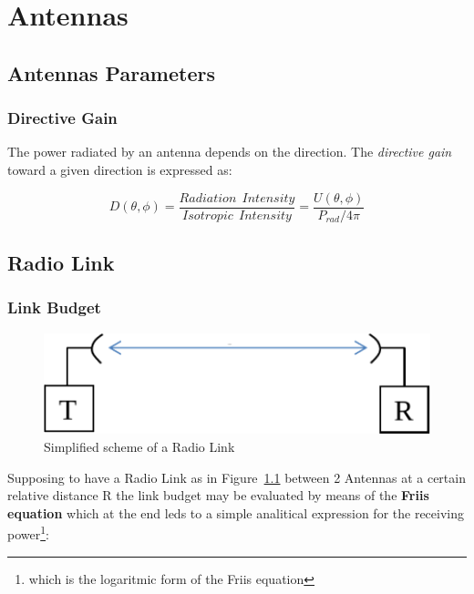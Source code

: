 \chapter{Antennas} %
\label{cha:antennas}

\section{Antennas Parameters} %
\label{sec:antennas_parameters}

\subsection{Directive Gain} %
\label{sub:directive_gain}

The power radiated by an antenna depends on the direction. The \textit{directive gain} toward a given direction is expressed as:

\begin{equation}
	D ( \theta, \phi) = \frac {Radiation \ \ Intensity} {Isotropic \ \ Intensity } = 	    \frac{ U(\theta , \phi)} {P_{rad}/ 4\pi}
\end{equation}





\section{Radio Link} %
\label{sec:radio_link}


\subsection{Link Budget} %
\label{sub:link_budget}

\begin{figure}[h]
	\centering
	\includegraphics[scale=0.6]{Immagini/link}
	
	\caption{Simplified scheme of a Radio Link}
	\label{fig:link}
\end{figure}

Supposing to have a Radio Link as in Figure~\ref{fig:link} between 2 Antennas at a certain relative distance R the link budget may be evaluated by means of the \textbf{Friis equation} which at the end leds to a simple analitical expression for the receiving power\footnote{which is the logaritmic form of the Friis equation}:

